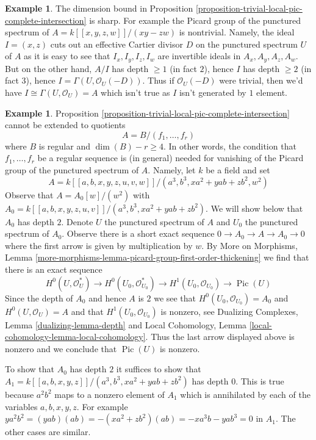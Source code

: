 \documentclass{stacks-project}
\theoremstyle{plain}
\theoremstyle{definition}
\newtheorem{example}[subsection]{Example}
\theoremstyle{remark}
\numberwithin{equation}{subsection}
\def\Pic{\mathop{\mathrm{Pic}}\nolimits}
\begin{document}
\begin{example}
\label{example-grothendieck-sharp}
The dimension bound in
Proposition \ref{proposition-trivial-local-pic-complete-intersection}
is sharp. For example the Picard group of the punctured spectrum of
$A = k[[x, y, z, w]]/(xy - zw)$ is nontrivial. Namely, the
ideal $I = (x, z)$ cuts out an effective Cartier divisor $D$ on the punctured
spectrum $U$ of $A$ as it is easy to see that $I_x, I_y, I_z, I_w$
are invertible ideals in $A_x, A_y, A_z, A_w$. But on the other hand,
$A/I$ has depth $\geq 1$ (in fact $2$), hence $I$ has depth $\geq 2$
(in fact $3$), hence
$I = \Gamma(U, \mathcal{O}_U(-D))$. Thus if $\mathcal{O}_U(-D)$
were trivial, then we'd have $I \cong \Gamma(U, \mathcal{O}_U) = A$
which isn't true as $I$ isn't generated by $1$ element.
\end{example}

\begin{example}
\label{example-grothendieck-sharp-bis}
Proposition \ref{proposition-trivial-local-pic-complete-intersection}
cannot be extended to quotients
$$
A = B/(f_1, \ldots, f_r)
$$
where $B$ is regular and $\dim(B) - r \geq 4$. In other words, the condition
that $f_1, \ldots, f_r$ be a regular sequence is (in general) needed
for vanishing of the Picard group of the punctured spectrum of $A$.
Namely, let $k$ be a field and set
$$
A = k[[a, b, x, y, z, u, v, w]]/(a^3, b^3, xa^2 + yab + zb^2, w^2)
$$
Observe that $A = A_0[w]/(w^2)$ with
$A_0 = k[[a, b, x, y, z, u, v]]/(a^3, b^3, xa^2 + yab + zb^2)$.
We will show below that $A_0$ has depth $2$.
Denote $U$ the punctured spectrum of $A$ and $U_0$ the punctured
spectrum of $A_0$. Observe there is a short exact sequence
$0 \to A_0 \to A \to A_0 \to 0$ where the first arrow is
given by multiplication by $w$.
By More on Morphisms, Lemma
\ref{more-morphisms-lemma-picard-group-first-order-thickening}
we find that there is an exact sequence
$$
H^0(U, \mathcal{O}_U^*) \to
H^0(U_0, \mathcal{O}_{U_0}^*) \to
H^1(U_0, \mathcal{O}_{U_0}) \to
\Pic(U)
$$
Since the depth of $A_0$ and hence $A$ is $2$ we see that
$H^0(U_0, \mathcal{O}_{U_0}) = A_0$ and $H^0(U, \mathcal{O}_U) = A$
and that $H^1(U_0, \mathcal{O}_{U_0})$ is nonzero, see
Dualizing Complexes, Lemma \ref{dualizing-lemma-depth} and
Local Cohomology, Lemma \ref{local-cohomology-lemma-local-cohomology}.
Thus the last arrow displayed above is nonzero and we conclude
that $\Pic(U)$ is nonzero.

\medskip\noindent
To show that $A_0$ has depth $2$ it suffices to show that
$A_1 = k[[a, b, x, y, z]]/(a^3, b^3, xa^2 + yab + zb^2)$
has depth $0$. This is true because $a^2b^2$ maps to
a nonzero element of $A_1$ which is annihilated
by each of the variables $a, b, x, y, z$. For example
$ya^2b^2 = (yab)(ab) = - (xa^2 + zb^2)(ab) = -xa^3b - yab^3 = 0$ in $A_1$.
The other cases are similar.
\end{example}
\end{document}
